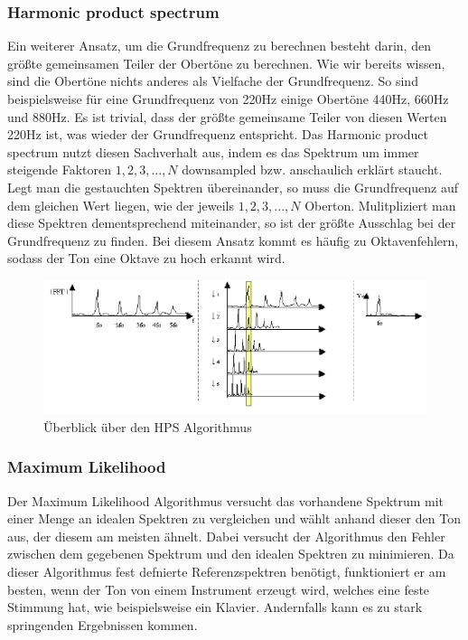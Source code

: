 \subsubsection*{Harmonic product spectrum}
Ein weiterer Ansatz, um die Grundfrequenz zu berechnen besteht darin, den größte gemeinsamen Teiler der Obertöne zu berechnen. Wie wir bereits wissen, sind die Obertöne nichts anderes als Vielfache der Grundfrequenz. So sind beispielsweise für eine Grundfrequenz von 220Hz einige Obertöne 440Hz, 660Hz und 880Hz. Es ist trivial, dass der größte gemeinsame Teiler von diesen Werten 220Hz ist, was wieder der Grundfrequenz entspricht. Das Harmonic product spectrum nutzt diesen Sachverhalt aus, indem es das Spektrum um immer steigende Faktoren $1,2,3,...,N$ downsampled bzw. anschaulich erklärt staucht. Legt man die gestauchten Spektren übereinander, so muss die Grundfrequenz auf dem gleichen Wert liegen, wie der jeweils $1,2,3,...,N$ Oberton. Mulitpliziert man diese Spektren dementsprechend miteinander, so ist der größte Ausschlag bei der Grundfrequenz zu finden. Bei diesem Ansatz kommt es häufig zu Oktavenfehlern, sodass der Ton eine Oktave zu hoch erkannt wird. \cite{cuadra2001hps}
\begin{figure}[H]
    \centering
    \includegraphics[width=1\textwidth]{Bilder/hps_algo.png}
    \caption{Überblick über den HPS Algorithmus \cite{cuadra2001hps}}
    \label{sec:hps_algo}
\end{figure}

\subsubsection*{Maximum Likelihood}
Der Maximum Likelihood Algorithmus versucht das vorhandene Spektrum mit einer Menge an idealen Spektren zu vergleichen und wählt anhand dieser den Ton aus, der diesem am meisten ähnelt. Dabei versucht der Algorithmus den Fehler zwischen dem gegebenen Spektrum und den idealen Spektren zu minimieren. Da dieser Algorithmus fest defnierte Referenzspektren benötigt, funktioniert er am besten, wenn der Ton von einem Instrument erzeugt wird, welches eine feste Stimmung hat, wie beispielsweise ein Klavier. Andernfalls kann es zu stark springenden Ergebnissen kommen. \cite{cuadra2001hps}

